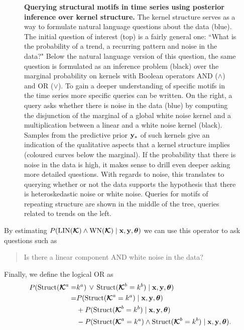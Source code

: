 \begin{figure}
\centering

\caption{{\footnotesize \bf Querying structural motifs in time series using posterior inference
over kernel structure.} The kernel structure serves as a way to formulate
natural language questions about the data (blue). The initial question of interest
(top) is a fairly
general one: ``What is the probability of a trend, a recurring
pattern and noise in the data?" Below the natural language version of this
question, the same question is formulated as an inference problem (black) over the
marginal probability on kernels with Boolean operators AND ($\land$) and OR ($\lor$). 
To gain  a deeper understanding of specific motifs in the time series more specific queries can
be written.
On the right, a query asks whether there is noise in the data (blue) by computing the disjunction of the marginal
of a global white noise kernel and a multiplication between a linear and a white
noise kernel (black). Samples from the predictive prior $\mathbf{y}_*$ of such kernels give an
indication of the qualitative aspects that a kernel structure implies (coloured curves below
the marginal). 
If the probability that there is noise in the data is high, it makes sense
to drill even deeper asking more detailed questions. With regards to noise, this
translates to querying whether or not the data supports the hypothesis that there is
heteroskedastic noise or white noise. Queries for motifs of repeating structure
are shown in the middle of the tree, queries related to trends on the left.}\label{fig:query}
\end{figure}
By estimating $P(\text{LIN}(\bm{\mathcal{K}}) \land \text{WN}(\bm{\mathcal{K}}) \mid \mathbf{x}, \mathbf{y}, \bm{\theta})$ we can use this operator to ask questions such as 
\begin{quotation}
Is there a linear component AND white noise in the data? 
\end{quotation}
Finally, we define the logical OR as
\begin{align*}
P(\text{Struct}(\bm{\mathcal{K}}^a= & k^a)\, \lor\, \text{Struct}(\bm{\mathcal{K}}^b=k^b) \mid \mathbf{x}, \mathbf{y}, \bm{\theta}) \\
= & P(\text{Struct}(\bm{\mathcal{K}}^a=k^a) \mid \mathbf{x}, \mathbf{y}, \bm{\theta}) \\
 & + P(\text{Struct}(\bm{\mathcal{K}}^b=k^b) \mid \mathbf{x}, \mathbf{y}, \bm{\theta}) \\
 & - P(\text{Struct}(\bm{\mathcal{K}}^a=k^a) \land \text{Struct}(\bm{\mathcal{K}}^b=k^b) \mid \mathbf{x}, \mathbf{y}, \bm{\theta}).
\end{align*}
